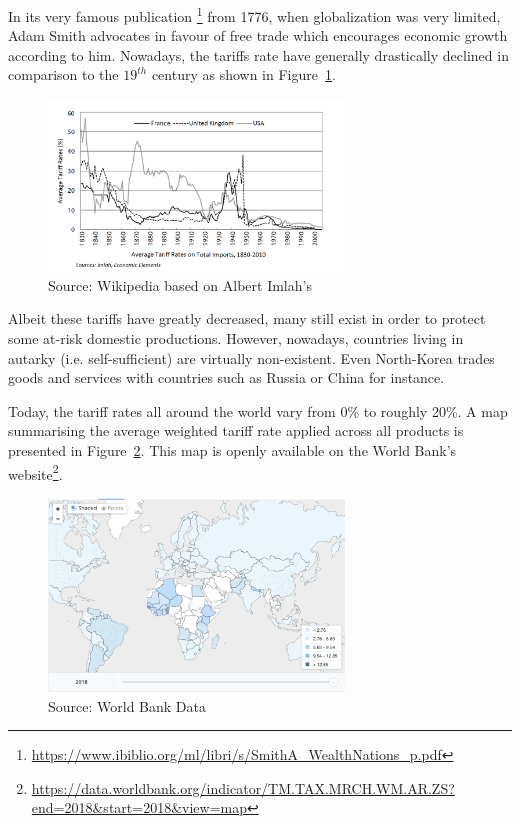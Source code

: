     In its very famous publication \footnote{\url{https://www.ibiblio.org/ml/libri/s/SmithA_WealthNations_p.pdf}} from 1776, when globalization was very limited, Adam Smith advocates in favour of free trade which encourages economic growth according to him. Nowadays, the tariffs rate have generally drastically declined in comparison to the $19^{th}$ century as shown in Figure~\ref{fig:average_tariffs_history}.
    
    \begin{figure}[H]
        \centering
        \includegraphics[width=0.7\textwidth]{img/avg_tariff_rates_US_FR_UK.png}
        \caption{Source: Wikipedia based on Albert Imlah's }
        \label{fig:average_tariffs_history}
    \end{figure}
    
    Albeit these tariffs have greatly decreased, many still exist in order to protect some at-risk domestic productions. However, nowadays, countries living in autarky (i.e. self-sufficient) are virtually non-existent. Even North-Korea trades goods and services with countries such as Russia or China for instance.
    
    Today, the tariff rates all around the world vary from 0\% to roughly 20\%. A map summarising the average weighted tariff rate applied across all products is presented in Figure~\ref{fig:world_bank_tariffs}. This map is openly available on the World Bank's website\footnote{\url{https://data.worldbank.org/indicator/TM.TAX.MRCH.WM.AR.ZS?end=2018&start=2018&view=map}}.
    
    \begin{figure}[H]
        \centering
        \includegraphics[width=0.7\textwidth]{img/world_bank_tariffs.jpg}
        \caption{Source: World Bank Data}
        \label{fig:world_bank_tariffs}
    \end{figure}
    
